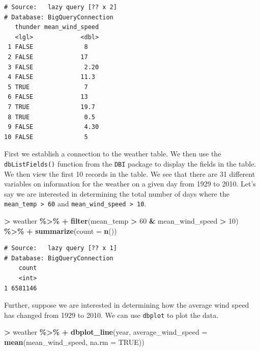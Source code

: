 \documentclass[
]{krantz}
\makeatletter
\newenvironment{Shaded}{\begin{snugshade}}{\end{snugshade}}
\newcommand{\DataTypeTok}[1]{\textcolor[rgb]{0.27,0.27,0.27}{#1}}
\newcommand{\DecValTok}[1]{\textcolor[rgb]{0.06,0.06,0.06}{#1}}
\newcommand{\KeywordTok}[1]{\textcolor[rgb]{0.27,0.27,0.27}{\textbf{#1}}}
\newcommand{\NormalTok}[1]{#1}
\newcommand{\OperatorTok}[1]{\textcolor[rgb]{0.43,0.43,0.43}{\textbf{#1}}}
\newcommand{\OtherTok}[1]{\textcolor[rgb]{0.37,0.37,0.37}{#1}}
\newcommand{\StringTok}[1]{\textcolor[rgb]{0.5,0.5,0.5}{#1}}
\newenvironment{kframe}{%
\medskip{}
\setlength{\fboxsep}{.8em}
 \def\at@end@of@kframe{}%
 \ifinner\ifhmode%
  \def\at@end@of@kframe{\end{minipage}}%
  \begin{minipage}{\columnwidth}%
 \fi\fi%
 \def\FrameCommand##1{\hskip\@totalleftmargin \hskip-\fboxsep
 \colorbox{shadecolor}{##1}\hskip-\fboxsep
     \hskip-\linewidth \hskip-\@totalleftmargin \hskip\columnwidth}%
 \MakeFramed {\advance\hsize-\width
   \@totalleftmargin\z@ \linewidth\hsize
   \@setminipage}}%
 {\par\unskip\endMakeFramed%
 \at@end@of@kframe}
\renewenvironment{Shaded}{\begin{kframe}}{\end{kframe}}
\makeatother
\begin{document}
\begin{verbatim}
# Source:   lazy query [?? x 2]
# Database: BigQueryConnection
   thunder mean_wind_speed
   <lgl>             <dbl>
 1 FALSE              8   
 2 FALSE             17   
 3 FALSE              2.20
 4 FALSE             11.3 
 5 TRUE               7   
 6 FALSE             13   
 7 TRUE              19.7 
 8 TRUE               0.5 
 9 FALSE              4.30
10 FALSE              5   
\end{verbatim}

First we establish a connection to the weather table. We then use the \texttt{dbListFields()} function from the \texttt{DBI} package to display the fields in the table. We then view the first 10 records in the table. We see that there are 31 different variables on information for the weather on a given day from 1929 to 2010. Let's say we are interested in determining the total number of days where the \texttt{mean\_temp\ \textgreater{}\ 60} and \texttt{mean\_wind\_speed\ \textgreater{}\ 10}.

\begin{Shaded}
\begin{Highlighting}[]
\OperatorTok{\textgreater{}}\StringTok{ }\NormalTok{weather }\OperatorTok{\%\textgreater{}\%}
\OperatorTok{+}\StringTok{   }\KeywordTok{filter}\NormalTok{(mean\_temp }\OperatorTok{\textgreater{}}\StringTok{ }\DecValTok{60} \OperatorTok{\&}\StringTok{ }\NormalTok{mean\_wind\_speed }\OperatorTok{\textgreater{}}\StringTok{ }\DecValTok{10}\NormalTok{) }\OperatorTok{\%\textgreater{}\%}
\OperatorTok{+}\StringTok{   }\KeywordTok{summarize}\NormalTok{(}\DataTypeTok{count =} \KeywordTok{n}\NormalTok{())}
\end{Highlighting}
\end{Shaded}

\begin{verbatim}
# Source:   lazy query [?? x 1]
# Database: BigQueryConnection
    count
    <int>
1 6581146
\end{verbatim}

Further, suppose we are interested in determining how the average wind speed has changed from 1929 to 2010. We can use \texttt{dbplot} to plot the data.

\begin{Shaded}
\begin{Highlighting}[]
\OperatorTok{\textgreater{}}\StringTok{ }\NormalTok{weather }\OperatorTok{\%\textgreater{}\%}
\OperatorTok{+}\StringTok{   }\KeywordTok{dbplot\_line}\NormalTok{(year, }\DataTypeTok{average\_wind\_speed =} \KeywordTok{mean}\NormalTok{(mean\_wind\_speed, }\DataTypeTok{na.rm =} \OtherTok{TRUE}\NormalTok{))}
\end{Highlighting}
\end{Shaded}
\end{document}

